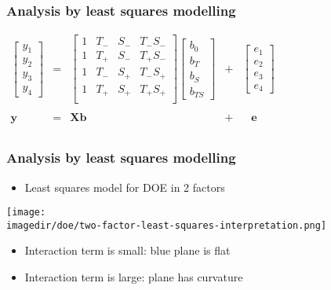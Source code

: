 \begin{frame}\frametitle{Analysis by least squares modelling}

	$
	\begin{array}{rcccl}
		\begin{bmatrix}
			y_1\\
			y_2\\
			y_3 \\
			y_4
		\end{bmatrix}
		&=&
		\begin{bmatrix}
			1 & T_{-} & S_{-} & T_{-}S_{-}\\
			1 & T_{+} & S_{-} & T_{+}S_{-}\\
			1 & T_{-} & S_{+} & T_{-}S_{+}\\
			1 & T_{+} & S_{+} & T_{+}S_{+}\\
		\end{bmatrix}
		\begin{bmatrix}
			b_0 \\
			b_T \\
			b_S \\
			b_{TS}
		\end{bmatrix}
		&+&
		\begin{bmatrix}
			e_1\\
			e_2\\
			e_3 \\
			e_4
		\end{bmatrix}
		\\
		\\
		\mathbf{y} &=& \mathbf{X} \mathbf{b} &+& \,\,\,\,\,\mathbf{e} \\
	\end{array}
	$
\end{frame}

\begin{frame}\frametitle{Analysis by least squares modelling}
	\begin{itemize}
		\item	Least squares model for DOE in 2 factors
	\end{itemize}
	\begin{center}
		\texttt{[image: \\imagedir/doe/two-factor-least-squares-interpretation.png]}
	\end{center}
	\begin{itemize}
		\item	Interaction term is small: blue plane is flat
		\item	Interaction term is large: plane has curvature
	\end{itemize}
\end{frame}


